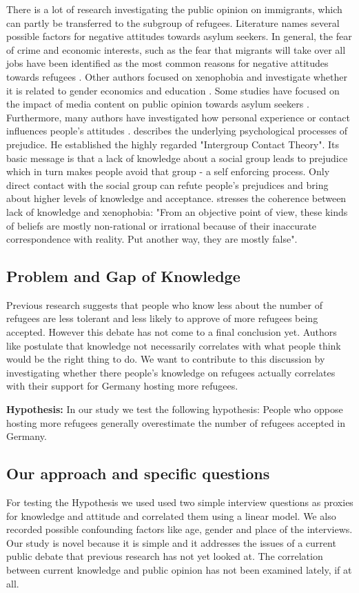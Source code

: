 There is a lot of research investigating the public opinion on immigrants, which can partly be transferred to the subgroup of refugees. Literature names several possible factors for negative attitudes towards asylum seekers. In general, the fear of crime and economic interests, such as the fear that migrants will take over all jobs have been identified as the most common reasons for negative attitudes towards refugees \citep{Otto2014}. Other authors focused on xenophobia and investigate whether it is related to gender \citep{Jolly2014} economics and education \citep{Francois2013}. Some studies have focused on the impact of media content on public opinion towards asylum seekers \citep{Boomgaarden2009, Perry1990, Brosius1995}. Furthermore, many authors have investigated how personal experience or contact influences people's attitudes \citep{Pettigrew1997}. \cite{Pettigrew1998} describes the underlying psychological processes of prejudice. He established the highly regarded "Intergroup Contact Theory". Its basic message is that a lack of knowledge about a social group leads to prejudice which in turn makes people avoid that group - a self enforcing process. Only direct contact with the social group can refute people's prejudices and bring about higher levels of knowledge and acceptance. \cite{Rydgren2004} stresses the coherence between lack of knowledge and xenophobia: "From an objective point of view, these kinds of beliefs are mostly non-rational or irrational because of their inaccurate correspondence with reality. Put another way, they are mostly false".

\subsection{Problem and Gap of Knowledge}
Previous research suggests that people who know less about the number of refugees are less tolerant and less likely to approve of more refugees being accepted. However this debate has not come to a final conclusion yet. Authors like \cite{Kahan2014} postulate that knowledge not necessarily correlates with what people think would be the right thing to do. We want to contribute to this discussion by investigating whether there people’s knowledge on refugees actually correlates with their support for Germany hosting more refugees.



\textbf{Hypothesis:}
In our study we test the following hypothesis: People who oppose hosting more refugees generally overestimate the number of refugees accepted in Germany.


\subsection{Our approach and specific questions}

For testing the Hypothesis we used used two simple interview questions as proxies for knowledge and attitude and correlated them using a linear model. We also recorded possible confounding factors like age, gender and place of the interviews.
Our study is novel because it is simple and it addresses the issues of a current public debate that previous research has not yet looked at. The correlation between current knowledge and public opinion has not been examined lately, if at all.
